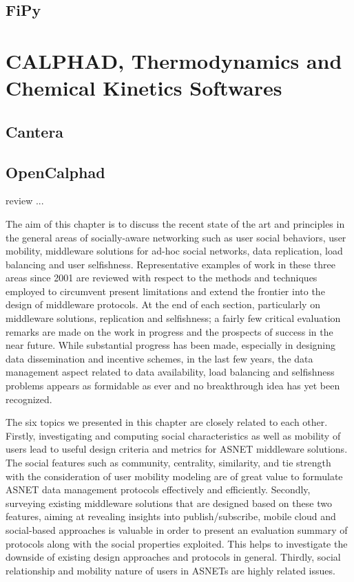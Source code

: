 \subsection{FiPy}

\section{CALPHAD, Thermodynamics and Chemical Kinetics Softwares}
\subsection{Cantera}
\subsection{OpenCalphad}

review
...

The aim of this chapter is to discuss the recent state of the art and principles in the general areas of socially-aware networking such as user social behaviors, user mobility, middleware solutions for ad-hoc social networks, data replication, load balancing and user selfishness. Representative examples of work in these three areas since 2001 are reviewed with respect to the methods and techniques employed to circumvent present limitations and extend the frontier into the design of middleware protocols. At the end of each section, particularly on middleware solutions, replication and selfishness; a fairly few critical evaluation remarks are made on the work in progress and the prospects of success in the near future. While substantial progress has been made, especially in designing data dissemination and incentive schemes, in the last few years, the data management aspect related to data availability, load balancing and selfishness problems appears as formidable as ever and no breakthrough idea has yet been recognized.

The six topics we presented in this chapter are closely related to each other. Firstly, investigating and computing social characteristics as well as mobility of users lead to useful design criteria and metrics for ASNET middleware solutions. The social features such as community, centrality, similarity, and tie strength with the consideration of user mobility modeling are of great value to formulate ASNET data management protocols effectively and efficiently. Secondly, surveying existing middleware solutions that are designed based on these two features, aiming at revealing insights into publish/subscribe, mobile cloud and social-based approaches is valuable in order to present an evaluation summary of protocols along with the social properties exploited. This helps to investigate the downside of existing design approaches and protocols in general.  Thirdly, social relationship and mobility nature of users in ASNETs are highly related issues.

